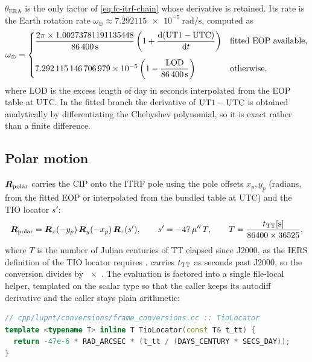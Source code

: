$\theta_{\mathrm{ERA}}$ is the only factor of \cref{eq:fc-itrf-chain} whose
derivative is retained. Its rate is the Earth rotation rate
$\omega_\oplus \approx \SI{7.292115e-5}{\radian\per\second}$, computed as
%
\begin{equation}
  \label{eq:fc-omega-earth}
  \omega_\oplus =
  \begin{cases}
    \dfrac{2\pi \times 1.00273781191135448}{\SI{86400}{\second}}
      \left(1 + \dfrac{\mathrm{d}(\mathrm{UT1}-\mathrm{UTC})}{\mathrm{d} t}\right)
      & \text{fitted EOP available,}\\[3.2ex]
    \num{7.292115146706979e-5}\left(1 - \dfrac{\mathrm{LOD}}{\SI{86400}{\second}}\right)
      & \text{otherwise,}
  \end{cases}
\end{equation}
%
where LOD is the excess length of day in seconds interpolated from the EOP
table at UTC. In the fitted branch the derivative of $\mathrm{UT1}-\mathrm{UTC}$ is
obtained analytically by differentiating the Chebyshev polynomial, so it is
exact rather than a finite difference.

\subsection{Polar motion}

$\bm{R}_{\mathrm{polar}}$ carries the CIP onto the ITRF pole using the pole
offsets $x_p, y_p$ (radians, from the fitted EOP or interpolated from the
bundled table at UTC) and the TIO locator $s'$:
%
\begin{equation}
  \label{eq:fc-polar}
  \bm{R}_{\mathrm{polar}}
  = \bm{R}_x(-y_p)\,\bm{R}_y(-x_p)\,\bm{R}_z(s'),
  \qquad
  s' = -47\,\mu''\,T,
  \qquad
  T = \frac{t_{\mathrm{TT}}[\si{\second}]}{86400 \times 36525},
\end{equation}
%
where $T$ is the number of Julian centuries of TT elapsed since J2000, as the
IERS definition of the TIO locator requires \citep[Eq.~(5.13)]{iers2010}.
\lupnt{} carries $t_{\mathrm{TT}}$ as seconds past J2000, so the conversion divides by
~$\times$~. The evaluation is factored into
a single file-local helper, templated on the scalar type so that the
 caller keeps its autodiff derivative and the  caller
stays plain arithmetic:

\begin{lstlisting}[language=cpp, caption={The one place the TIO locator is
  evaluated (\texttt{cpp/lupnt/conversions/frame\_conversions.cc}).},
  label={lst:fc-tio}]
// cpp/lupnt/conversions/frame_conversions.cc :: TioLocator
template <typename T> inline T TioLocator(const T& t_tt) {
  return -47e-6 * RAD_ARCSEC * (t_tt / (DAYS_CENTURY * SECS_DAY));
}
\end{lstlisting}

